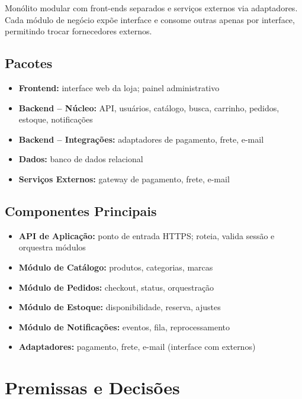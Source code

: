 \documentclass[12pt,a4paper]{article}
\providecommand{\tightlist}{%
  \setlength{\itemsep}{0pt}\setlength{\parskip}{0pt}}
\begin{document}
Monólito modular com front-ends separados e serviços externos via
adaptadores. Cada módulo de negócio expõe interface e consome outras
apenas por interface, permitindo trocar fornecedores externos.

\subsection{Pacotes}

\begin{itemize}
\tightlist
\item \textbf{Frontend:} interface web da loja; painel administrativo
\item \textbf{Backend -- Núcleo:} API, usuários, catálogo, busca, carrinho,
  pedidos, estoque, notificações
\item \textbf{Backend -- Integrações:} adaptadores de pagamento, frete, e-mail
\item \textbf{Dados:} banco de dados relacional
\item \textbf{Serviços Externos:} gateway de pagamento, frete, e-mail
\end{itemize}

\subsection{Componentes Principais}

\begin{itemize}
\tightlist
\item \textbf{API de Aplicação:} ponto de entrada HTTPS; roteia, valida
  sessão e orquestra módulos
\item \textbf{Módulo de Catálogo:} produtos, categorias, marcas
\item \textbf{Módulo de Pedidos:} checkout, status, orquestração
\item \textbf{Módulo de Estoque:} disponibilidade, reserva, ajustes
\item \textbf{Módulo de Notificações:} eventos, fila, reprocessamento
\item \textbf{Adaptadores:} pagamento, frete, e-mail (interface com externos)
\end{itemize}

\section{Premissas e Decisões}\label{sec:premissas}
\end{document}
